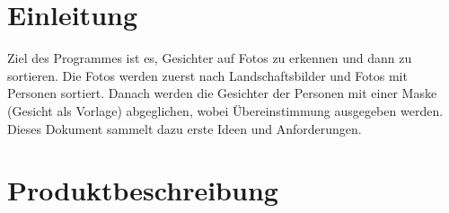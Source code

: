 \documentclass[
10pt, %
a4paper, %
oneside, %
headinclude,footinclude, %
BCOR5mm, %
]{scrartcl}
\title{\normalfont\spacedallcaps{Fotos per Gesichtserkennung sortieren}} %
\author{\spacedlowsmallcaps{Johannes Horvath \& Eva Witzel}} %
\date{15.10.2014} %
\begin{document}

\renewcommand{\sectionmark}[1]{\markright{\spacedlowsmallcaps{#1}}} %
\lehead{\mbox{\llap{\small\thepage\kern1em\color{halfgray} \vline}\color{halfgray}\hspace{0.5em}\rightmark\hfil}} %

\pagestyle{scrheadings} %


\maketitle %

\setcounter{tocdepth}{2} %

\tableofcontents %




\section*{Einleitung} 
Ziel des Programmes ist es, Gesichter auf Fotos zu erkennen und dann zu sortieren.
Die Fotos werden zuerst nach Landschaftsbilder und Fotos mit Personen sortiert. Danach werden die Gesichter der Personen mit einer Maske (Gesicht als Vorlage) abgeglichen, wobei Übereinstimmung ausgegeben werden.
Dieses Dokument sammelt dazu erste Ideen und Anforderungen.

\section{Produktbeschreibung} 
\end{document}

